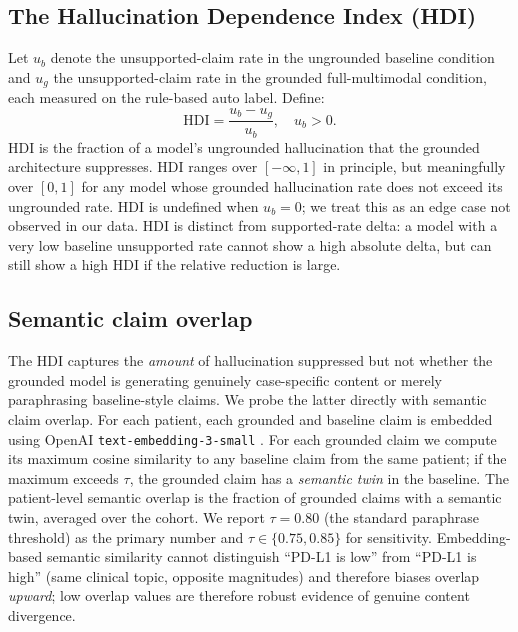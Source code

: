 \documentclass[11pt]{article}
\begin{document}
\subsection{The Hallucination Dependence Index (HDI)}
Let $u_b$ denote the unsupported-claim rate in the ungrounded baseline condition and $u_g$ the unsupported-claim rate in the grounded full-multimodal condition, each measured on the rule-based auto label. Define:
\begin{equation}
\text{HDI} = \frac{u_b - u_g}{u_b}, \quad u_b > 0.
\label{eq:hdi}
\end{equation}
HDI is the fraction of a model's ungrounded hallucination that the grounded architecture suppresses. HDI ranges over $[-\infty, 1]$ in principle, but meaningfully over $[0, 1]$ for any model whose grounded hallucination rate does not exceed its ungrounded rate. HDI is undefined when $u_b = 0$; we treat this as an edge case not observed in our data. HDI is distinct from supported-rate delta: a model with a very low baseline unsupported rate cannot show a high absolute delta, but can still show a high HDI if the relative reduction is large.

\subsection{Semantic claim overlap}
The HDI captures the \emph{amount} of hallucination suppressed but not whether the grounded model is generating genuinely case-specific content or merely paraphrasing baseline-style claims. We probe the latter directly with semantic claim overlap. For each patient, each grounded and baseline claim is embedded using OpenAI \texttt{text-embedding-3-small} \citep{openai2024embeddings}. For each grounded claim we compute its maximum cosine similarity to any baseline claim from the same patient; if the maximum exceeds $\tau$, the grounded claim has a \emph{semantic twin} in the baseline. The patient-level semantic overlap is the fraction of grounded claims with a semantic twin, averaged over the cohort. We report $\tau = 0.80$ (the standard paraphrase threshold) as the primary number and $\tau \in \{0.75, 0.85\}$ for sensitivity. Embedding-based semantic similarity cannot distinguish ``PD-L1 is low'' from ``PD-L1 is high'' (same clinical topic, opposite magnitudes) and therefore biases overlap \emph{upward}; low overlap values are therefore robust evidence of genuine content divergence.
\end{document}
